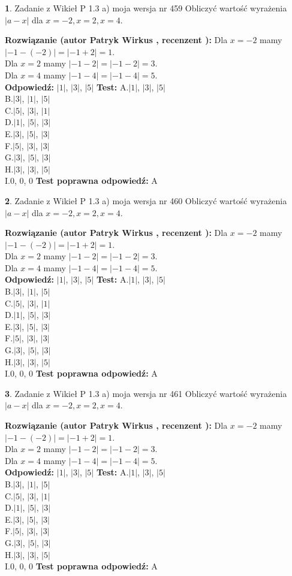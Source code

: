 \documentclass[12pt, a4paper]{article}
\theoremstyle{definition} %
\newtheorem{zad}{}
\newcommand{\zadStart}[1]{\begin{zad}#1\newline}
\newcommand{\zadStop}{\end{zad}}
\newcommand{\rozwStart}[2]{\noindent \textbf{Rozwiązanie (autor #1 , recenzent #2): }\newline}
\newcommand{\rozwStop}{\newline}
\newcommand{\odpStart}{\noindent \textbf{Odpowiedź:}\newline}
\newcommand{\odpStop}{\newline}
\newcommand{\testStart}{\noindent \textbf{Test:}\newline}
\newcommand{\testStop}{\newline}
\newcommand{\kluczStart}{\noindent \textbf{Test poprawna odpowiedź:}\newline}
\newcommand{\kluczStop}{\newline}
\begin{document}
\zadStart{Zadanie z Wikieł P 1.3 a) moja wersja nr 459}
Obliczyć wartość wyrażenia $|a - x|$ dla $x=-2,x=2,x=4$.
\zadStop
\rozwStart{Patryk Wirkus}{}
Dla $x = -2$ mamy $|-1 - (-2)| = |-1 + 2| = 1$.\\
Dla $x = 2$ mamy $|-1 - 2| = |-1 - 2| = 3$.\\
Dla $x = 4$ mamy $|-1 - 4| = |-1 - 4| = 5$.\\
\rozwStop
\odpStart
$|1|$, $|3|$, $|5|$
\odpStop
\testStart
A.$|1|$, $|3|$, $|5|$\\
B.$|3|$, $|1|$, $|5|$\\
C.$|5|$, $|3|$, $|1|$\\
D.$|1|$, $|5|$, $|3|$\\
E.$|3|$, $|5|$, $|3|$\\
F.$|5|$, $|3|$, $|3|$\\
G.$|3|$, $|5|$, $|3|$\\
H.$|3|$, $|3|$, $|5|$\\
I.$0$, $0$, $0$
\testStop
\kluczStart
A
\kluczStop



\zadStart{Zadanie z Wikieł P 1.3 a) moja wersja nr 460}
Obliczyć wartość wyrażenia $|a - x|$ dla $x=-2,x=2,x=4$.
\zadStop
\rozwStart{Patryk Wirkus}{}
Dla $x = -2$ mamy $|-1 - (-2)| = |-1 + 2| = 1$.\\
Dla $x = 2$ mamy $|-1 - 2| = |-1 - 2| = 3$.\\
Dla $x = 4$ mamy $|-1 - 4| = |-1 - 4| = 5$.\\
\rozwStop
\odpStart
$|1|$, $|3|$, $|5|$
\odpStop
\testStart
A.$|1|$, $|3|$, $|5|$\\
B.$|3|$, $|1|$, $|5|$\\
C.$|5|$, $|3|$, $|1|$\\
D.$|1|$, $|5|$, $|3|$\\
E.$|3|$, $|5|$, $|3|$\\
F.$|5|$, $|3|$, $|3|$\\
G.$|3|$, $|5|$, $|3|$\\
H.$|3|$, $|3|$, $|5|$\\
I.$0$, $0$, $0$
\testStop
\kluczStart
A
\kluczStop



\zadStart{Zadanie z Wikieł P 1.3 a) moja wersja nr 461}
Obliczyć wartość wyrażenia $|a - x|$ dla $x=-2,x=2,x=4$.
\zadStop
\rozwStart{Patryk Wirkus}{}
Dla $x = -2$ mamy $|-1 - (-2)| = |-1 + 2| = 1$.\\
Dla $x = 2$ mamy $|-1 - 2| = |-1 - 2| = 3$.\\
Dla $x = 4$ mamy $|-1 - 4| = |-1 - 4| = 5$.\\
\rozwStop
\odpStart
$|1|$, $|3|$, $|5|$
\odpStop
\testStart
A.$|1|$, $|3|$, $|5|$\\
B.$|3|$, $|1|$, $|5|$\\
C.$|5|$, $|3|$, $|1|$\\
D.$|1|$, $|5|$, $|3|$\\
E.$|3|$, $|5|$, $|3|$\\
F.$|5|$, $|3|$, $|3|$\\
G.$|3|$, $|5|$, $|3|$\\
H.$|3|$, $|3|$, $|5|$\\
I.$0$, $0$, $0$
\testStop
\kluczStart
A
\kluczStop
\end{document}
